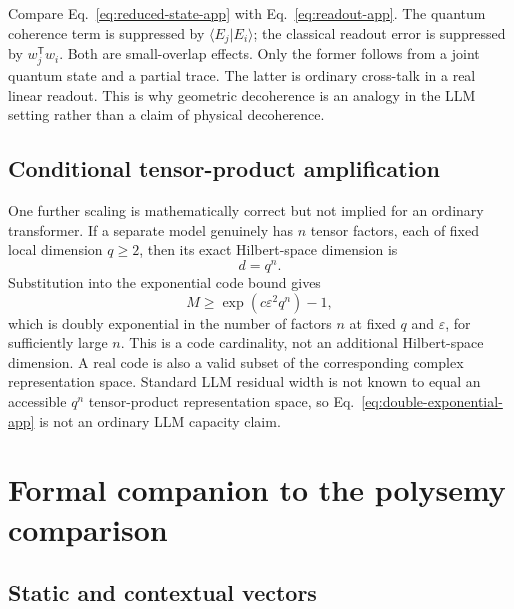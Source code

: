 \documentclass[
  aps,
  reprint,
  superscriptaddress,
  floatfix,
  nofootinbib,
  longbibliography
]{revtex4-2}
\newcommand{\T}{^{\mathsf T}}
\begin{document}
Compare Eq.~\eqref{eq:reduced-state-app} with
Eq.~\eqref{eq:readout-app}.  The quantum coherence term is suppressed by
$\langle E_j|E_i\rangle$; the classical readout error is suppressed by
$w_j\T w_i$.  Both are small-overlap effects.  Only the former follows from a
joint quantum state and a partial trace.  The latter is ordinary cross-talk in
a real linear readout.  This is why geometric decoherence is an analogy in the
LLM setting rather than a claim of physical decoherence.

\subsection{Conditional tensor-product amplification}

One further scaling is mathematically correct but not implied for an ordinary
transformer.  If a separate model genuinely has $n$ tensor factors, each of
fixed local dimension $q\geq2$, then its exact Hilbert-space dimension is
\begin{equation}
 d=q^n.
 \label{eq:tensor-dimension-app}
\end{equation}
Substitution into the exponential code bound gives
\begin{equation}
 M\geq\exp(c\varepsilon^2q^n)-1,
 \label{eq:double-exponential-app}
\end{equation}
which is doubly exponential in the number of factors $n$ at fixed $q$ and
$\varepsilon$, for sufficiently large $n$.  This is a code cardinality, not
an additional Hilbert-space dimension.  A real code is also a valid subset of
the corresponding complex representation space.  Standard LLM residual width
is not known to equal an accessible $q^n$ tensor-product representation space, so
Eq.~\eqref{eq:double-exponential-app} is not an ordinary LLM capacity claim.

\section{Formal companion to the polysemy comparison}
\label{app:polysemy}

\subsection{Static and contextual vectors}
\end{document}
